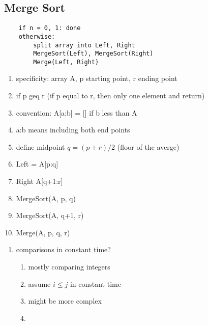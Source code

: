 \documentclass{article}
\begin{document}
\subsection{Merge Sort}
\begin{verbatim}
    if n = 0, 1: done
    otherwise:
        split array into Left, Right
        MergeSort(Left), MergeSort(Right)
        Merge(Left, Right)
\end{verbatim}
\begin{enumerate}
    \item specificity: array A, p starting point, r ending point
    \item if p geq r (if p equal to r, then only one element and return)
    \item convention: A[a:b] = [] if b less than A
    \item a:b means including both end points
    \item define midpoint $q = (p+r)/2$ (floor of the averge)
    \item Left = A[p:q]
    \item Right A[q+1:r]
    \item MergeSort(A, p, q)
    \item MergeSort(A, q+1, r)
    \item Merge(A, p, q, r)
\end{enumerate}
\begin{enumerate}

\item comparisons in constant time? \begin{enumerate}
    \item mostly comparing integers
    \item assume $i \leq j$ in constant time
    \item might be more complex
    \item    
\end{enumerate}
\end{enumerate}
\end{document}

